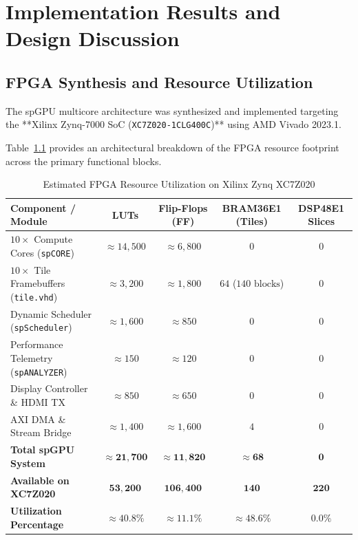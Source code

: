 \chapter{Implementation Results and Design Discussion}
\label{chap:synthesis_results}

\section{FPGA Synthesis and Resource Utilization}
The spGPU multicore architecture was synthesized and implemented targeting the **Xilinx Zynq-7000 SoC (\texttt{XC7Z020-1CLG400C})** using AMD Vivado 2023.1. 

Table~\ref{tab:resource_utilization} provides an architectural breakdown of the FPGA resource footprint across the primary functional blocks.

\begin{table}[htbp]
\centering
\caption{Estimated FPGA Resource Utilization on Xilinx Zynq XC7Z020}
\label{tab:resource_utilization}
\begin{tabular}{@{}lcccc@{}}
\toprule
\textbf{Component / Module} & \textbf{LUTs} & \textbf{Flip-Flops (FF)} & \textbf{BRAM36E1 (Tiles)} & \textbf{DSP48E1 Slices} \\ \midrule
$10\times$ Compute Cores (\texttt{spCORE}) & $\approx 14{,}500$ & $\approx 6{,}800$ & $0$ & $0$ \\
$10\times$ Tile Framebuffers (\texttt{tile.vhd}) & $\approx 3{,}200$ & $\approx 1{,}800$ & $64$ ($140\text{ blocks}$) & $0$ \\
Dynamic Scheduler (\texttt{spScheduler}) & $\approx 1{,}600$ & $\approx 850$ & $0$ & $0$ \\
Performance Telemetry (\texttt{spANALYZER}) & $\approx 150$ & $\approx 120$ & $0$ & $0$ \\
Display Controller \& HDMI TX & $\approx 850$ & $\approx 650$ & $0$ & $0$ \\
AXI DMA \& Stream Bridge & $\approx 1{,}400$ & $\approx 1{,}600$ & $4$ & $0$ \\ \midrule
\textbf{Total spGPU System} & $\approx \mathbf{21{,}700}$ & $\approx \mathbf{11{,}820}$ & $\approx \mathbf{68}$ & $\mathbf{0}$ \\
\textbf{Available on XC7Z020} & $\mathbf{53{,}200}$ & $\mathbf{106{,}400}$ & $\mathbf{140}$ & $\mathbf{220}$ \\
\textbf{Utilization Percentage} & $\approx \mathbf{40.8\%}$ & $\approx \mathbf{11.1\%}$ & $\approx \mathbf{48.6\%}$ & $\mathbf{0.0\%}$ \\ \bottomrule
\end{tabular}
\end{table}


